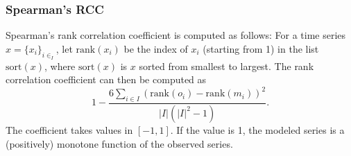 \documentclass[11pt]{article}
\theoremstyle{definition}
\begin{document}
\subsubsection{Spearman's RCC}
Spearman's rank correlation coefficient \cite{spearman04} is computed as follows: For a time series $x=\{x_i\}_{i\in_I}$, let $\mathrm{rank}(x_i)$ be the index of $x_i$ (starting from 1) in the list $\mathrm{sort}(x)$, where $\mathrm{sort}(x)$ is $x$ sorted from smallest to largest. The rank correlation coefficient can then be computed as
\[
1 - \frac{6\sum_{i\in I}(\mathrm{rank}(o_i)-\mathrm{rank}(m_i))^2}{|I|(|I|^2 - 1)}.
\]
The coefficient takes values in $[-1, 1]$. If the value is 1, the modeled series is a (positively) monotone function of the observed series.




\end{document}
